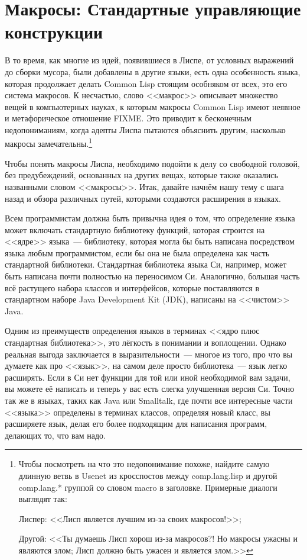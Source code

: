 \chapter{Макросы: Стандартные управляющие конструкции}
\label{ch:07}

В то время, как многие из идей, появившиеся в Лиспе, от условных выражений до сборки
мусора, были добавлены в другие языки, есть одна особенность языка, которая продолжает
делать Common Lisp стоящим особняком от всех, это его система макросов. К несчастью, слово
<<макрос>> описывает множество вещей в компьютерных науках, к которым макросы Common Lisp
имеют неявное и метафорическое отношение FIXME. Это приводит к бесконечным недопониманиям,
когда адепты Лиспа пытаются объяснить другим, насколько макросы
замечательны.\footnote{Чтобы посмотреть на что это недопонимание похоже, найдите самую
  длинную ветвь в Usenet из кросспостов между comp.lang.lisp и другой comp.lang.* группой
  со словом macro в заголовке. Примерные диалоги выглядят так:

Лиспер: <<Лисп является лучшим из-за своих макросов!>>;

Другой: <<Ты думаешь Лисп хорош из-за макросов?! Но макросы ужасны и являются злом; Лисп
должно быть ужасен и является злом.>>}

Чтобы понять макросы Лиспа, необходимо подойти к делу со свободной головой, без
предубеждений, основанных на других вещах, которые также оказались названными словом
<<макросы>>. Итак, давайте начнём нашу тему с шага назад и обзора различных путей, которыми
создаются расширения в языках.

Всем программистам должна быть привычна идея о том, что определение языка может включать
стандартную библиотеку функций, которая строится на <<ядре>> языка~--- библиотеку, которая
могла бы быть написана посредством языка любым программистом, если бы она не была
определена как часть стандартной библиотеки. Стандартная библиотека языка Си, например,
может быть написана почти полностью на переносимом Си. Аналогично, большая часть всё
растущего набора классов и интерфейсов, которые поставляются в стандартном наборе Java
Development Kit (JDK), написаны на <<чистом>> Java.

Одним из преимуществ определения языков в терминах <<ядро плюс стандартная библиотека>>, это
лёгкость в понимании и воплощении. Однако реальная выгода заключается в выразительности~---
многое из того, про что вы думаете как про <<язык>>, на самом деле просто библиотека~--- язык
легко расширять. Если в Си нет функции для той или иной необходимой вам задачи, вы можете
её написать и теперь у вас есть слегка улучшенная версия Си. Точно так же в языках, таких
как Java или Smalltalk, где почти все интересные части <<языка>> определены в терминах
классов, определяя новый класс, вы расширяете язык, делая его более подходящим для
написания программ, делающих то, что вам надо.

